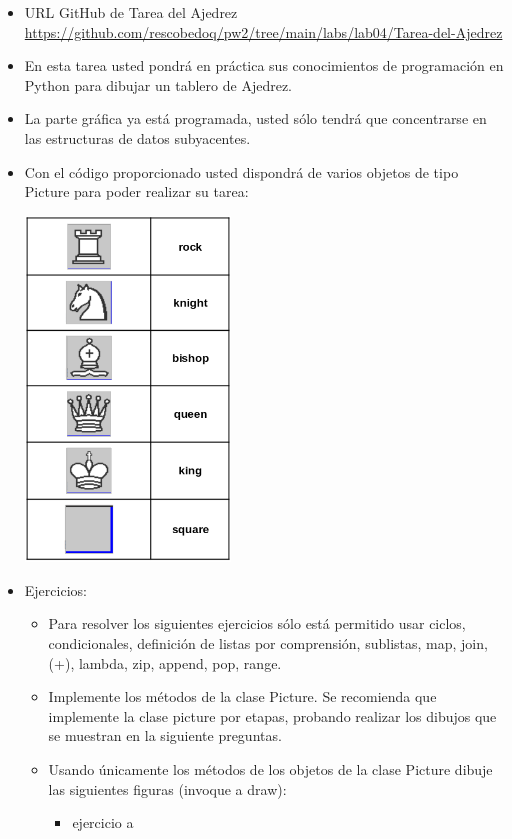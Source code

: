 \documentclass{article}
\begin{document}
\begin{itemize}
	\item URL GitHub de Tarea del Ajedrez \url{https://github.com/rescobedoq/pw2/tree/main/labs/lab04/Tarea-del-Ajedrez}
	\item En esta tarea usted pondrá en práctica sus conocimientos de programación en Python para dibujar un tablero de Ajedrez.
	\item La parte gráfica ya está programada, usted sólo tendrá que concentrarse en las estructuras de datos subyacentes.
	\item Con el código proporcionado usted dispondrá de varios objetos de tipo Picture para poder realizar su tarea:
	      \begin{center}
		      \includegraphics[width=154.679pt,height=259.8607pt]{img/piezas.png}
	      \end{center}
	\item Ejercicios:
	      \begin{itemize}
		      \item Para resolver los siguientes ejercicios sólo está permitido usar ciclos, condicionales, definición de listas por comprensión, sublistas, map, join, (+), lambda, zip, append, pop, range.
		      \item Implemente los métodos de la clase Picture. Se recomienda que implemente la clase picture por etapas, probando realizar los dibujos que se muestran en la siguiente preguntas.
		      \item Usando únicamente los métodos de los objetos de la clase Picture dibuje las siguientes figuras (invoque a draw):
		            \begin{itemize}
			            \item ejercicio a

\end{itemize}
\end{itemize}
\end{itemize}
\end{document}
